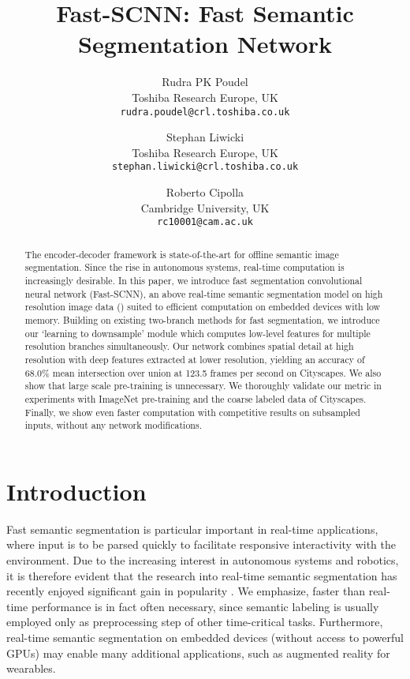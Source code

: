 \documentclass[10pt,twocolumn,letterpaper]{article}
\begin{document}
\title{Fast-SCNN: Fast Semantic Segmentation Network}

\author{Rudra PK Poudel\\
Toshiba Research Europe, UK\\
{\tt\small rudra.poudel@crl.toshiba.co.uk}
\and Stephan Liwicki\\
Toshiba Research Europe, UK\\
{\tt\small stephan.liwicki@crl.toshiba.co.uk}
\and
Roberto Cipolla\\
Cambridge University, UK\\
{\tt\small rc10001@cam.ac.uk}
}

\maketitle


\begin{abstract}
The encoder-decoder framework is state-of-the-art for offline semantic image segmentation. Since the rise in autonomous systems, real-time computation is increasingly desirable. In this paper, we introduce fast segmentation convolutional neural network (Fast-SCNN), an above real-time semantic segmentation model on high resolution image data () suited to efficient computation on embedded devices with low memory. Building on existing two-branch methods for fast segmentation, we introduce our `learning to downsample' module which computes low-level features for multiple resolution branches simultaneously. Our network combines spatial detail at high resolution with deep features extracted at lower resolution, yielding an accuracy of 68.0\% mean intersection over union at 123.5 frames per second on Cityscapes. We also show that large scale pre-training is unnecessary. We thoroughly validate our metric in experiments with ImageNet pre-training and the coarse labeled data of Cityscapes. Finally, we show even faster computation with competitive results on subsampled inputs, without any network modifications.
\end{abstract} 

\section{Introduction}
Fast semantic segmentation is particular important in real-time applications, where input is to be parsed quickly to facilitate responsive interactivity with the environment. Due to the increasing interest in autonomous systems and robotics, it is therefore evident that the research into real-time semantic segmentation has recently enjoyed significant gain in popularity \cite{contextnet-poudel2018,BiSeNet-yu2018,gun-mazzini2018,erfnet-romera2018,icnet-zhao2017b,enet-paszke2016}. We emphasize, faster than real-time performance is in fact often necessary, since semantic labeling is usually employed only as preprocessing step of other time-critical tasks. Furthermore, real-time semantic segmentation on embedded devices (without access to powerful GPUs) may enable many additional applications, such as augmented reality for wearables.
\end{document}
